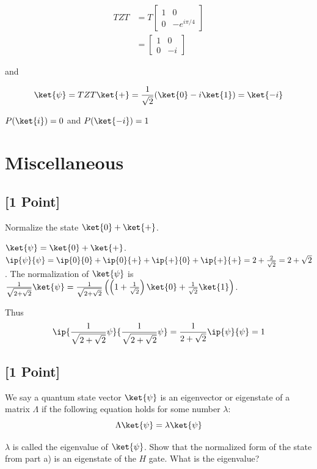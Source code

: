 \documentclass[11pt]{article}
\begin{document}
\begin{solution}
    \begin{align*}
        T Z T &= T \begin{bmatrix}
            1 & 0 \\ 0 & -e^{i \pi / 4}
        \end{bmatrix} \\ 
        &= \begin{bmatrix}
            1 & 0 \\ 0 & -i
        \end{bmatrix}
    \end{align*}

    and 
    
    \[\ket{\psi} = T Z T \ket{+} = \frac{1}{\sqrt{2}} (\ket{0} - i \ket{1}) = \ket{-i}\]

    $P(\ket{i}) = 0$ and $P(\ket{-i}) = 1$ 
\end{solution}


\section{Miscellaneous}

\subsection{[1 Point]} Normalize the state $\ket{0} + \ket{+}$.

\begin{solution}
    $\ket{\psi} = \ket{0} + \ket{+}$. $\ip{\psi}{\psi} = \ip{0}{0} + \ip{0}{+} + \ip{+}{0} + \ip{+}{+} = 2 + \frac{2}{\sqrt{2}} = 2 + \sqrt{2}$. The normalization of $\ket{\psi}$ is $\frac{1}{\sqrt{2 + \sqrt{2}}} \ket{\psi} = \frac{1}{\sqrt{2 + \sqrt{2}}}\left(\left(1 + \frac{1}{\sqrt{2}}\right) \ket{0} + \frac{1}{\sqrt{2}} \ket{1}\right)$. 
    
    Thus \[\ip{\frac{1}{\sqrt{2 + \sqrt{2}}} \psi}{\frac{1}{\sqrt{2 + \sqrt{2}}} \psi} = \frac{1}{2 + \sqrt{2}} \ip{\psi}{\psi} = 1\]
\end{solution}

\subsection{[1 Point]} We say a quantum state vector $\ket{\psi}$ is an eigenvector or eigenstate of a matrix $\Lambda$ if the following equation holds for some number $\lambda$:
\[
\Lambda \ket{\psi} = \lambda \ket{\psi}
\]

$\lambda$ is called the eigenvalue of $\ket{\psi}$. Show that the normalized form of the state from part a) is an eigenstate of the $H$ gate. What is the eigenvalue?
\end{document}
